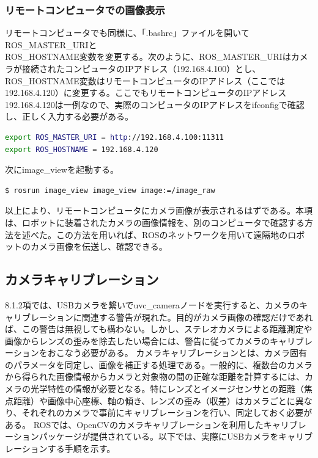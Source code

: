 \subsubsection{リモートコンピュータでの画像表示}

リモートコンピュータでも同様に、「.bashrc」ファイルを開いてROS\_MASTER\_URIと\\ROS\_HOSTNAME変数を変更する。次のように、ROS\_MASTER\_URIはカメラが接続されたコンピュータのIPアドレス（192.168.4.100）とし、ROS\_HOSTNAME変数はリモートコンピュータのIPアドレス（ここでは192.168.4.120）に変更する。ここでもリモートコンピュータのIPアドレス192.168.4.120は一例なので、実際のコンピュータのIPアドレスをifconfigで確認し、正しく入力する必要がある。

\begin{lstlisting}[language=bash]
export ROS_MASTER_URI = http://192.168.4.100:11311
export ROS_HOSTNAME = 192.168.4.120
\end{lstlisting}

次にimage\_viewを起動する。

\begin{lstlisting}[language=ROS]
$ rosrun image_view image_view image:=/image_raw
\end{lstlisting}

以上により、リモートコンピュータにカメラ画像が表示されるはずである。本項は、ロボットに装着されたカメラの画像情報を、別のコンピュータで確認する方法を述べた。この方法を用いれば、ROSのネットワークを用いて遠隔地のロボットのカメラ画像を伝送し、確認できる。

\subsection{カメラキャリブレーション}

8.1.2項では、USBカメラを繋いでuvc\_cameraノードを実行すると、カメラのキャリブレーションに関連する警告が現れた。目的がカメラ画像の確認だけであれば、この警告は無視しても構わない。しかし、ステレオカメラによる距離測定や画像からレンズの歪みを除去したい場合には、警告に従ってカメラのキャリブレーションをおこなう必要がある。
カメラキャリブレーションとは、カメラ固有のパラメータを同定し、画像を補正する処理である。一般的に、複数台のカメラから得られた画像情報からカメラと対象物の間の正確な距離を計算するには、カメラの光学特性の情報が必要となる。特にレンズとイメージセンサとの距離（焦点距離）や画像中心座標、軸の傾き、レンズの歪み（収差）はカメラごとに異なり、それぞれのカメラで事前にキャリブレーションを行い、同定しておく必要がある。
ROSでは、OpenCVのカメラキャリブレーションを利用したキャリブレーションパッケージが提供されている。以下では、実際にUSBカメラをキャリブレーションする手順を示す。

